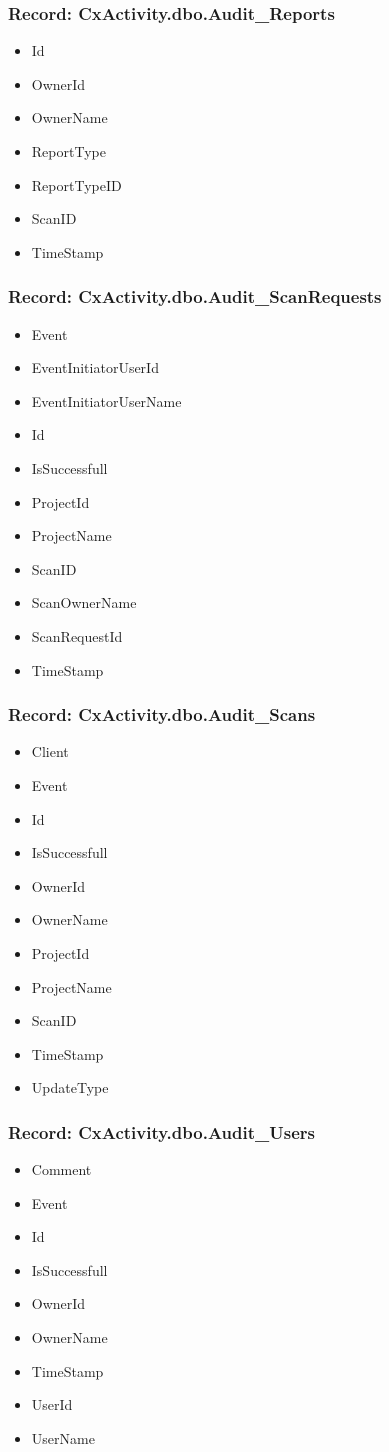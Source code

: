 \subsubsection{Record: CxActivity.dbo.Audit\_Reports}
\begin{itemize}
    \item Id
    \item OwnerId
    \item OwnerName
    \item ReportType
    \item ReportTypeID
    \item ScanID
    \item TimeStamp
\end{itemize}

\subsubsection{Record: CxActivity.dbo.Audit\_ScanRequests}
\begin{itemize}
    \item Event
    \item EventInitiatorUserId
    \item EventInitiatorUserName
    \item Id
    \item IsSuccessfull
    \item ProjectId
    \item ProjectName
    \item ScanID
    \item ScanOwnerName
    \item ScanRequestId
    \item TimeStamp
\end{itemize}

\subsubsection{Record: CxActivity.dbo.Audit\_Scans}
\begin{itemize}
    \item Client
    \item Event
    \item Id
    \item IsSuccessfull
    \item OwnerId
    \item OwnerName
    \item ProjectId
    \item ProjectName
    \item ScanID
    \item TimeStamp
    \item UpdateType
\end{itemize}


\subsubsection{Record: CxActivity.dbo.Audit\_Users}
\begin{itemize}
    \item Comment
    \item Event
    \item Id
    \item IsSuccessfull
    \item OwnerId
    \item OwnerName
    \item TimeStamp
    \item UserId
    \item UserName
\end{itemize}
